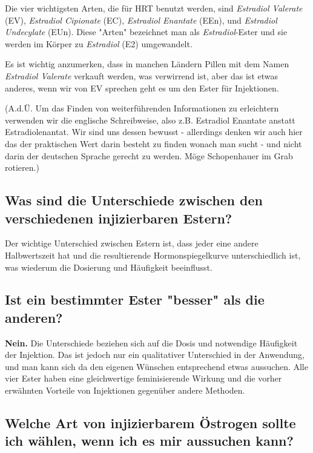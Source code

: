 \documentclass{article}
\begin{document}
Die vier wichtigsten Arten, die für HRT benutzt werden, sind \textit{Estradiol Valerate} (EV), \textit{Estradiol Cipionate} (EC), \textit{Estradiol Enantate} (EEn), und \textit{Estradiol Undecylate} (EUn). Diese "Arten" bezeichnet man als \textit{Estradiol}-Ester und sie werden im Körper zu \textit{Estradiol} (E2)  umgewandelt. 

Es ist wichtig anzumerken, dass in manchen Ländern Pillen mit dem Namen \textit{Estradiol Valerate} verkauft werden, was verwirrend ist, aber das ist etwas anderes, wenn wir von EV sprechen geht es um den Ester für Injektionen.

(A.d.Ü. Um das Finden von weiterführenden Informationen zu erleichtern verwenden wir die englische Schreibweise, also z.B. Estradiol Enantate anstatt Estradiolenantat. Wir sind uns dessen bewusst - allerdings denken wir auch hier das der praktischen Wert darin besteht zu finden wonach man sucht - und nicht darin der deutschen Sprache gerecht zu werden. Möge Schopenhauer im Grab rotieren.)

\subsection{Was sind die Unterschiede zwischen den verschiedenen injizierbaren Estern?}

Der wichtige Unterschied zwischen Estern ist, dass jeder eine andere Halbwertszeit hat und die resultierende Hormonspiegelkurve unterschiedlich ist, was wiederum die Dosierung und Häufigkeit beeinflusst.

\subsection{Ist ein bestimmter Ester "besser" als die anderen?}

\textbf{Nein.} Die Unterschiede beziehen sich auf die Dosis und notwendige Häufigkeit der Injektion. Das ist jedoch nur ein qualitativer Unterschied in der Anwendung, und man kann sich da den eigenen Wünschen entsprechend etwas aussuchen. Alle vier Ester haben eine gleichwertige feminisierende Wirkung und die vorher erwähnten Vorteile von Injektionen gegenüber andere Methoden. 

\subsection{Welche Art von injizierbarem Östrogen sollte ich wählen, wenn ich es mir aussuchen kann?}
\end{document}
